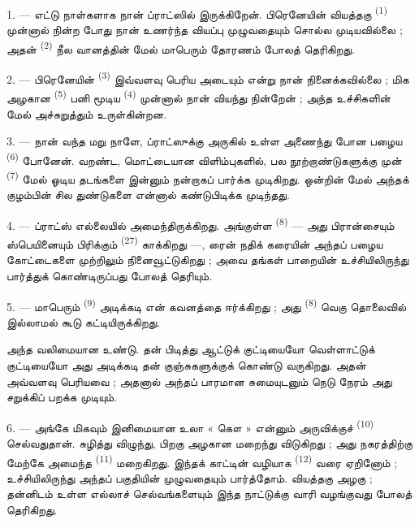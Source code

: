 1. --- எட்டு நாள்களாக நான் ப்ராட்ஸில் இருக்கிறேன். பிரெனேயின் வியத்தகு
 \textsuperscript{(1)} முன்னால் நின்ற போது நான்
உணர்ந்த வியப்பு முழுவதையும் சொல்ல முடியவில்லை ; அதன் 
\textsuperscript{(2)} நீல வானத்தின் மேல் மாபெரும் தோரணம் போலத்
தெரிகிறது.

2. --- பிரெனேயின்  \textsuperscript{(3)} இவ்வளவு பெரிய
 அடையும் என்று நான் நினைக்கவில்லை ; மிக அழகான
 \textsuperscript{(5)} பனி மூடிய  \textsuperscript{(4)} முன்னால் நான் வியந்து
நின்றேன் ; அந்த உச்சிகளின் மேல் அச்சுறுத்தும்  உருள்கின்றன.

\VUsaut{3.0mm}
\VUsaut{3.0mm}

3. --- நான் வந்த மறு நாளே, ப்ராட்ஸுக்கு அருகில் உள்ள அணைந்து போன பழைய
 \textsuperscript{(6)} போனேன். 
வறண்ட, மொட்டையான விளிம்புகளில், பல நூற்றாண்டுகளுக்கு முன்
 \textsuperscript{(7)} மேல் ஓடிய  தடங்களை இன்னும் நன்றாகப் பார்க்க முடிகிறது.
 ஒன்றின் மேல் அந்தக் குழம்பின் சில துண்டுகளை
என்னால் கண்டுபிடிக்க முடிந்தது.

4. --- ப்ராட்ஸ் எல்லையில் அமைந்திருக்கிறது. அங்குள்ள
 \textsuperscript{(8)} — அது பிரான்சையும் ஸ்பெயினையும்
பிரிக்கும்  \textsuperscript{(27)} காக்கிறது —,
ரைன் நதிக் கரையின் அந்தப் பழைய
கோட்டைகளை முற்றிலும் நினைவூட்டுகிறது ; அவை தங்கள் பாறையின் உச்சியிலிருந்து
 பார்த்துக் கொண்டிருப்பது போலத் தெரியும்.

5. --- மாபெரும்  \textsuperscript{(9)} அடிக்கடி என்
கவனத்தை ஈர்க்கிறது ; அது  \textsuperscript{(8)}
வெகு தொலைவில் இல்லாமல் கூடு கட்டியிருக்கிறது.

அந்த  வலிமையான  உண்டு. தன்
 பிடித்து ஆட்டுக் குட்டியையோ வெள்ளாட்டுக் குட்டியையோ
அது அடிக்கடி தன் குஞ்சுகளுக்குக் கொண்டு வருகிறது. அதன்
 அவ்வளவு பெரியவை ; அதனால் அந்தப் பாரமான சுமையுடனும்
நெடு நேரம் அது சறுக்கிப் பறக்க முடியும்.

\VUsaut{3.0mm}
\VUsaut{3.0mm}

6. --- அங்கே மிகவும் இனிமையான உலா « கௌ » என்னும் அருவிக்குச்
\textsuperscript{(10)} செல்வதுதான்.  சுழித்து
விழுந்து, பிறகு அழகான  மறைந்து விடுகிறது ; அது
நகரத்திற்கு மேற்கே அமைந்த 
\textsuperscript{(11)} மறைகிறது. இந்தக் காட்டின் வழியாக  \textsuperscript{(12)} வரை ஏறினோம் ; 
உச்சியிலிருந்து அந்தப் பகுதியின்  முழுவதையும்
பார்த்தோம்.  வியத்தகு அழகு ; 
தன்னிடம் உள்ள எல்லாச் செல்வங்களையும் இந்த நாட்டுக்கு வாரி
வழங்குவது போலத் தெரிகிறது.

